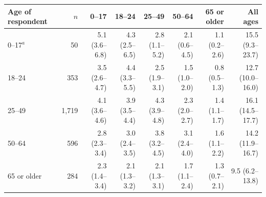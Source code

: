 \begin{tabular}{lrrrrrrr}
\toprule
Age of respondent & $n$ & 0--17 & 18--24 & 25--49 & 50--64 & 65 or older & All ages \\
\midrule
0--17$^{a}$ & 50 & 5.1 (3.6--6.8) & 4.3 (2.5--6.5) & 2.8 (1.1--5.2) & 2.1 (0.6--4.5) & 1.1 (0.2--2.6) & 15.5 (9.3--23.7) \\
18--24 & 353 & 3.5 (2.6--4.7) & 4.4 (3.3--5.5) & 2.5 (1.9--3.1) & 1.5 (1.0--2.0) & 0.8 (0.5--1.3) & 12.7 (10.0--16.0) \\
25--49 & 1,719 & 4.1 (3.6--4.6) & 3.9 (3.5--4.4) & 4.3 (3.9--4.8) & 2.3 (2.0--2.7) & 1.4 (1.1--1.7) & 16.1 (14.5--17.7) \\
50--64 & 596 & 2.8 (2.3--3.4) & 3.0 (2.4--3.5) & 3.8 (3.2--4.5) & 3.1 (2.4--4.0) & 1.6 (1.1--2.2) & 14.2 (11.9--16.7) \\
65 or older & 284 & 2.3 (1.4--3.4) & 2.1 (1.3--3.2) & 2.1 (1.3--3.1) & 1.7 (1.1--2.4) & 1.3 (0.7--2.1) & 9.5 (6.2--13.8) \\
\bottomrule
\end{tabular}
